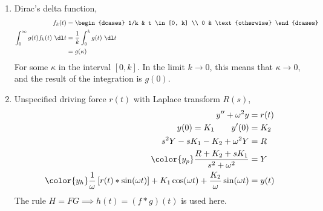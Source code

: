 \begin{enumerate}
\begin{enumerate}
              \item Dirac's delta function,
                    \begin{align}
                        f_k(t)        & = \begin{dcases}
                                              1/k & t \in [0, k]     \\
                                              0   & \text{otherwise}
                                          \end{dcases}              \\
                        \int_{0}^{\infty} g(t)
                        f_k(t)\ \dl t & = \frac{1}{k}\int_{0}^{k} g(t)\ \dl t \\
                                      & = g(\kappa)
                    \end{align}
                    For some $ \kappa $ in the interval $ [0, k] $. In the limit
                    $ k \to 0 $, this means that $ \kappa \to 0 $, and the
                    result of the integration is $ g(0) $.

              \item Unspecified driving force $ r(t) $ with Laplace transform $ R(s) $,
                    \begin{align}
                        y'' + \omega^2 y               & = r(t) \\
                        y(0) = K_1 \qquad y'(0)        & = K_2  \\
                        s^2Y - sK_1 - K_2 + \omega^2 Y & = R    \\
                        \color{y_p} \frac{R + K_2 + sK_1}
                        {s^2 + \omega^2}               & = Y    \\
                        \color{y_h} \frac{1}{\omega}
                        \left[ r(t) * \sin(\omega t) \right]
                        + K_1 \cos(\omega t) + \frac{K_2}
                        {\omega} \sin(\omega t)        & = y(t)
                    \end{align}
                    The rule $ H = FG \implies h(t) = (f * g)(t) $ is used here.
          \end{enumerate}


\end{enumerate}

